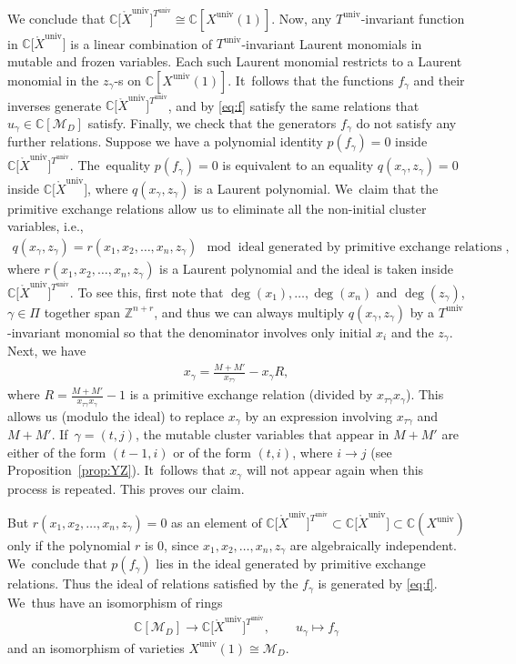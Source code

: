 \documentclass[pdftex]{sigma}%
\def\C{{\mathbb C}}
\def\Z{{\mathbb Z}}
\def\Uo{{\mathring{U}}}
\def\Xo{{\mathring{X}}}
\def\univ{{\operatorname{univ}}}
\def\M{{\mathcal{M}}}
\numberwithin{equation}{section}
\begin{document}
We conclude that $\C\big[\Xo^\univ\big]^{T^\univ} \!\!\cong \C[X^\univ(1)]$. Now, any $T^\univ$-invariant function in $\C\big[\Xo^\univ\big]$ is a linear combination of $T^\univ$-invariant Laurent monomials in mutable and frozen variables. Each such Laurent monomial restricts to a Laurent monomial in the $z_\gamma$-s on $\C[X^\univ(1)]$. It~follows that the functions $f_\gamma$ and their inverses generate $\C\big[\Xo^\univ\big]^{T^\univ}$, and by \eqref{eq:f} satisfy the same relations that $u_\gamma \in \C[\M_D]$ satisfy. Finally, we check that the generators $f_\gamma$ do not satisfy any further relations. Suppose we have a polynomial identity $p(f_\gamma) = 0$ inside $\C\big[\Xo^\univ\big]^{T^\univ}$. The~equality $p(f_\gamma) = 0$ is equivalent to an equality $q(x_\gamma,z_\gamma) = 0$ inside $\C\big[\Xo^\univ\big]$, where $q(x_\gamma,z_\gamma)$ is a Laurent polynomial. We~claim that the primitive exchange relations allow us to eliminate all the non-initial cluster variables, i.e.,
\begin{gather*}
q(x_\gamma,z_\gamma) = r(x_1,x_2,\dots,x_n,z_\gamma) \mod \mbox{ ideal generated by primitive exchange relations},
\end{gather*}
where $r(x_1,x_2,\dots,x_n,z_\gamma)$ is a Laurent polynomial and the ideal is taken inside $\C\big[\Xo^\univ\big]^{T^\univ}$. To see this, first note that $\deg(x_1),\dots,\deg(x_n)$ and $\deg(z_\gamma)$, $\gamma \in \Pi$ together span $\Z^{n+r}$, and thus we can always multiply $q(x_\gamma,z_\gamma)$ by a $T^\univ$-invariant monomial so that the denominator involves only initial $x_i$ and the $z_\gamma$. Next, we have
\begin{gather*}
x_\gamma = \frac{M+M'}{x_{\tau \gamma}} - x_\gamma R,
\end{gather*}
where $R = \frac{M+M'}{x_{\tau \gamma} x_\gamma} - 1$ is a primitive exchange relation (divided by $x_{\tau \gamma} x_\gamma$). This allows us (modulo the ideal) to replace $x_\gamma$ by an expression involving $x_{\tau \gamma}$ and $M+M'$. If~$\gamma = (t,j)$, the mutable cluster variables that appear in $M+M'$ are either of the form $(t-1,i)$ or of the form $(t,i)$, where $i \to j$ (see Proposition~\ref{prop:YZ}). It~follows that $x_\gamma$ will not appear again when this process is repeated. This proves our claim.

But $r(x_1,x_2,\dots,x_n,z_\gamma) = 0$ as an element of $\C\big[\Xo^\univ\big]^{T^\univ} \subset \C\big[\Xo^\univ\big] \subset \C(X^\univ)$ only if the polynomial $r$ is 0, since $x_1,x_2,\dots,x_n,z_\gamma$ are algebraically independent. We~conclude that $p(f_\gamma)$ lies in the ideal generated by primitive exchange relations. Thus the ideal of relations satisfied by the $f_\gamma$ is generated by \eqref{eq:f}. We~thus have an isomorphism of rings
\begin{gather*}
\C[\M_D] \longrightarrow \C\big[\Xo^\univ\big]^{T^\univ}, \qquad u_\gamma \longmapsto f_\gamma
\end{gather*}
and an isomorphism of varieties $X^\univ(1) \cong \M_D$. %
\end{document}
